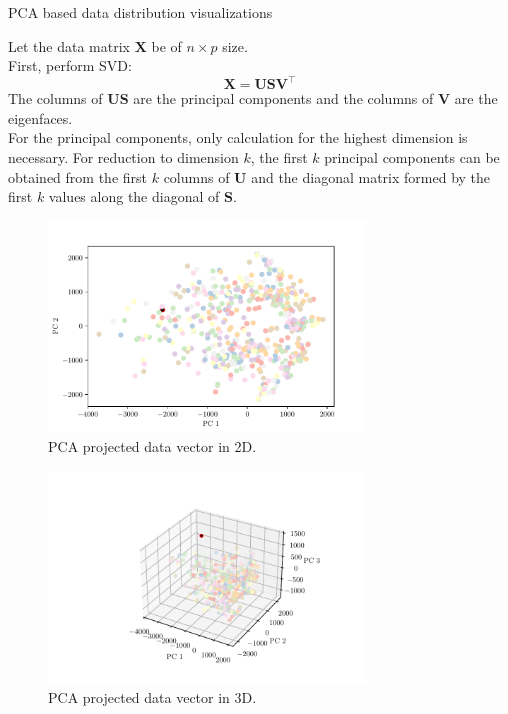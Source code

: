 \documentclass[a4paper,12pt,dvipdfmx]{exam}
\begin{document}
\begin{questions}
    \question PCA based data distribution visualizations

    Let the data matrix $\mathbf{X}$ be of $n \times p$ size.\\
    First, perform SVD:
    \begin{equation}
        \mathbf{X}=\mathbf{USV^\intercal}
    \end{equation}
    The columns of $\mathbf{US}$ are the principal components and the columns of $\mathbf{V}$ are the eigenfaces.\\
    For the principal components, only calculation for the highest dimension is necessary. For reduction to
    dimension $k$, the first $k$ principal components can be obtained from the first $k$ columns of
    $\mathbf{U}$ and the diagonal matrix formed by the first $k$ values along the diagonal of $\mathbf{S}$.

    \begin{figure}[h]
        \centering
        \includegraphics[width=0.75\textwidth]{pca_2d}
        \caption{PCA projected data vector in 2D.}
        \label{fig:pca_2d}
    \end{figure}

    \begin{figure}[ht]
        \centering
        \includegraphics[width=0.75\textwidth]{pca_3d}
        \caption{PCA projected data vector in 3D.}
        \label{fig:pca_3d}
    \end{figure}


\end{questions}
\end{document}
